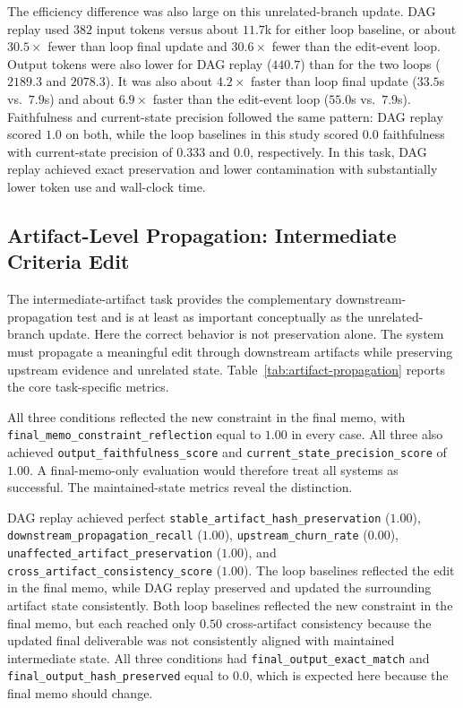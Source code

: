 \documentclass{article}
\begin{document}
The efficiency difference was also large on this unrelated-branch update. DAG replay used $382$ input tokens versus about $11.7$k for either loop baseline, or about $30.5\times$ fewer than loop final update and $30.6\times$ fewer than the edit-event loop. Output tokens were also lower for DAG replay ($440.7$) than for the two loops ($2189.3$ and $2078.3$). It was also about $4.2\times$ faster than loop final update ($33.5$s vs.\ $7.9$s) and about $6.9\times$ faster than the edit-event loop ($55.0$s vs.\ $7.9$s). Faithfulness and current-state precision followed the same pattern: DAG replay scored $1.0$ on both, while the loop baselines in this study scored $0.0$ faithfulness with current-state precision of $0.333$ and $0.0$, respectively. In this task, DAG replay achieved exact preservation and lower contamination with substantially lower token use and wall-clock time.

\subsection{Artifact-Level Propagation: Intermediate Criteria Edit}

The intermediate-artifact task provides the complementary downstream-propagation test and is at least as important conceptually as the unrelated-branch update. Here the correct behavior is not preservation alone. The system must propagate a meaningful edit through downstream artifacts while preserving upstream evidence and unrelated state. Table~\ref{tab:artifact-propagation} reports the core task-specific metrics.

All three conditions reflected the new constraint in the final memo, with \texttt{final\_memo\_constraint\_reflection} equal to $1.00$ in every case. All three also achieved \texttt{output\_faithfulness\_score} and \texttt{current\_state\_precision\_score} of $1.00$. A final-memo-only evaluation would therefore treat all systems as successful. The maintained-state metrics reveal the distinction.

DAG replay achieved perfect \texttt{stable\_artifact\_hash\_preservation} ($1.00$), \texttt{downstream\_propagation\_recall} ($1.00$), \texttt{upstream\_churn\_rate} ($0.00$), \texttt{unaffected\_artifact\_preservation} ($1.00$), and \texttt{cross\_artifact\_consistency\_score} ($1.00$). The loop baselines reflected the edit in the final memo, while DAG replay preserved and updated the surrounding artifact state consistently. Both loop baselines reflected the new constraint in the final memo, but each reached only $0.50$ cross-artifact consistency because the updated final deliverable was not consistently aligned with maintained intermediate state. All three conditions had \texttt{final\_output\_exact\_match} and \texttt{final\_output\_hash\_preserved} equal to $0.0$, which is expected here because the final memo should change.
\end{document}
